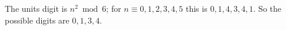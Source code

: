 The units digit is $n^2\bmod6$; for $n\equiv0,1,2,3,4,5$ this is $0,1,4,3,4,1$. So the possible digits are $\boxed{0,1,3,4}$.
